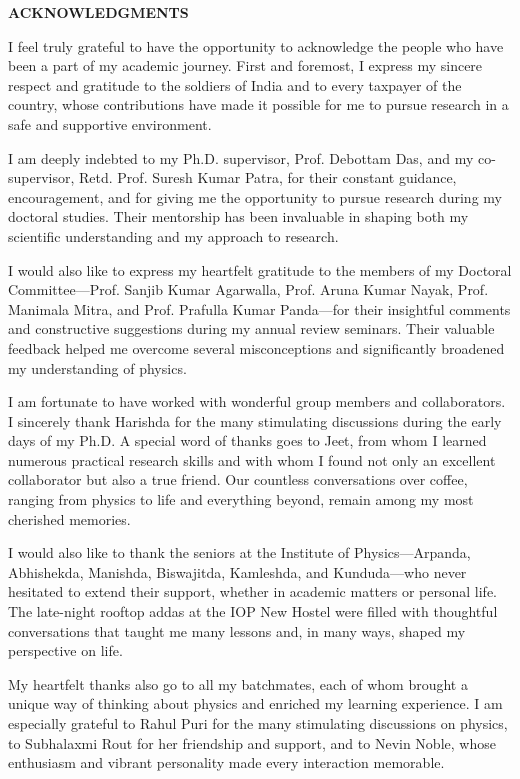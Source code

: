 \begin{center}
\large \bf
ACKNOWLEDGMENTS
\end{center}
\vspace{1.5cm}
I feel truly grateful to have the opportunity to acknowledge the people who have been a part of my academic journey. First and foremost, I express my sincere respect and gratitude to the soldiers of India and to every taxpayer of the country, whose contributions have made it possible for me to pursue research in a safe and supportive environment.

I am deeply indebted to my Ph.D. supervisor, Prof. Debottam Das, and my co-supervisor, Retd. Prof. Suresh Kumar Patra, for their constant guidance, encouragement, and for giving me the opportunity to pursue research during my doctoral studies. Their mentorship has been invaluable in shaping both my scientific understanding and my approach to research.

I would also like to express my heartfelt gratitude to the members of my Doctoral Committee—Prof. Sanjib Kumar Agarwalla, Prof. Aruna Kumar Nayak, Prof. Manimala Mitra, and Prof. Prafulla Kumar Panda—for their insightful comments and constructive suggestions during my annual review seminars. Their valuable feedback helped me overcome several misconceptions and significantly broadened my understanding of physics.

I am fortunate to have worked with wonderful group members and collaborators. I sincerely thank Harishda for the many stimulating discussions during the early days of my Ph.D. A special word of thanks goes to Jeet, from whom I learned numerous practical research skills and with whom I found not only an excellent collaborator but also a true friend. Our countless conversations over coffee, ranging from physics to life and everything beyond, remain among my most cherished memories.

I would also like to thank the seniors at the Institute of Physics—Arpanda, Abhishekda, Manishda, Biswajitda, Kamleshda, and Kunduda—who never hesitated to extend their support, whether in academic matters or personal life. The late-night rooftop addas at the IOP New Hostel were filled with thoughtful conversations that taught me many lessons and, in many ways, shaped my perspective on life.

My heartfelt thanks also go to all my batchmates, each of whom brought a unique way of thinking about physics and enriched my learning experience. I am especially grateful to Rahul Puri for the many stimulating discussions on physics, to Subhalaxmi Rout for her friendship and support, and to Nevin Noble, whose enthusiasm and vibrant personality made every interaction memorable.

